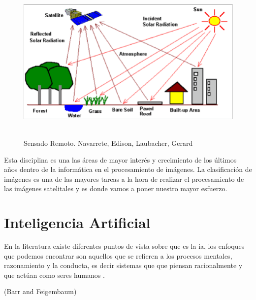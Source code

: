 \begin{figure}[H] \centering
  \includegraphics[height=8cm,keepaspectratio=true,clip=true]{imagenes/MarcoTeorico/teledeteccion.png}
  \caption{Sensado Remoto. Navarrete, Edison, Laubacher, Gerard}\label{Fig:teledeteccion}
\end{figure}

Esta disciplina es una las áreas de mayor interés y crecimiento de los últimos años dentro de la informática en el procesamiento de imágenes. La clasificación de imágenes es una de las mayores tareas a la hora de realizar el procesamiento de  las imágenes satelitales y es donde vamos a poner nuestro mayor esfuerzo.

\section{Inteligencia Artificial}\label{sec:inteligenciaA}

En la literatura existe diferentes puntos de vista sobre que es la \ac{ia}, los enfoques que podemos encontrar son aquellos que se refieren a los procesos mentales, razonamiento y la conducta, es decir sistemas que que piensan racionalmente y que actúan como seres humanos \citep{inteligenciaA}. 
\begin{center}
\begin{minipage}{0.8\linewidth}  
\begin{flushright}
  ({Barr and Feigembaum})
\end{flushright}
\vspace{5pt}
\end{minipage}
\end{center}

